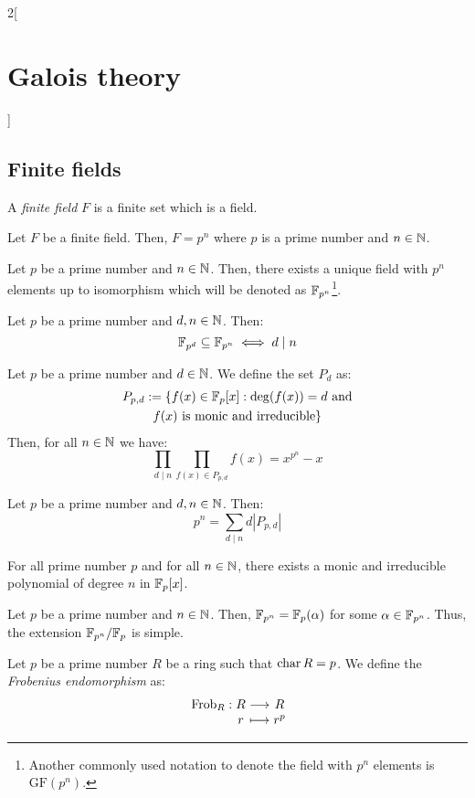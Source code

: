 \documentclass[../../../main.tex]{subfiles}
\begin{document}
\begin{multicols}{2}[\section{Galois theory}]
  \subsection{Finite fields}
  \begin{definition}
    A \textit{finite field} $F$ is a finite set which is a field.
  \end{definition}
  \begin{prop}
    Let $F$ be a finite field. Then, $F=p^n$ where $p$ is a prime number and $n\in\mathbb{N}$.
  \end{prop}
  \begin{theorem}
    Let $p$ be a prime number and $n\in\mathbb{N}$. Then, there exists a unique field with $p^n$ elements up to isomorphism which will be denoted as $\mathbb{F}_{p^n}$\footnote{Another commonly used notation to denote the field with $p^n$ elements is $\text{GF}(p^n)$.}.
  \end{theorem}
  \begin{prop}
    Let $p$ be a prime number and $d,n\in\mathbb{N}$. Then: $$\mathbb{F}_{p^d}\subseteq\mathbb{F}_{p^n}\iff d\mid n$$
  \end{prop}
  \begin{theorem}
    Let $p$ be a prime number and $d\in\mathbb{N}$. We define the set $P_d$ as:
    \begin{multline*}
      P_{p,d}:=\{f(x)\in\mathbb{F}_p[x]:\deg(f(x))=d\text{ and}\\\text{$f(x)$ is monic and irreducible}\}
    \end{multline*}
    Then, for all $n\in\mathbb{N}$ we have: $$\prod_{d\mid n}\prod_{f(x)\in P_{p,d}}f(x)=x^{p^n}-x$$
  \end{theorem}
  \begin{corollary}
    Let $p$ be a prime number and $d,n\in\mathbb{N}$. Then: $$p^n=\sum_{d\mid n}d|P_{p,d}|$$
  \end{corollary}
  \begin{corollary}
    For all prime number $p$ and for all $n\in\mathbb{N}$, there exists a monic and irreducible polynomial of degree $n$ in $\mathbb{F}_p[x]$.
  \end{corollary}
  \begin{corollary}
    Let $p$ be a prime number and $n\in\mathbb{N}$. Then, $\mathbb{F}_{p^n}=\mathbb{F}_p(\alpha)$ for some $\alpha\in\mathbb{F}_{p^n}$. Thus, the extension $\quot{\FF_{p^n}}{\FF_p}$ is simple.
  \end{corollary}
  \begin{definition}
    Let $p$ be a prime number $R$ be a ring such that $\operatorname{char} R=p$. We define the \textit{Frobenius endomorphism} as: $$\function{\text{Frob}_R}{R}{R}{r}{r^p}$$

\end{definition}
\end{multicols}
\end{document}
